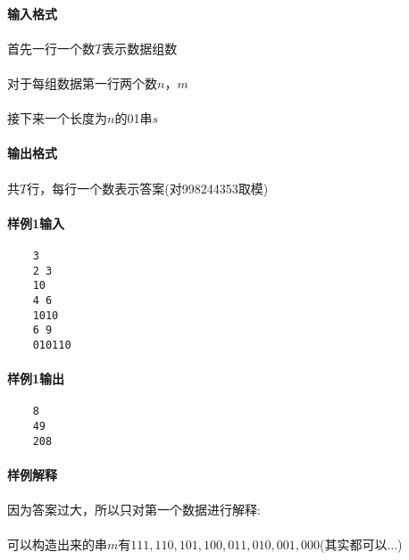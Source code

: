 \documentclass[UTF8]{ctexart}
\begin{document}
\paragraph{输入格式}
\paragraph{}首先一行一个数$T$表示数据组数
\paragraph{}对于每组数据第一行两个数$n$，$m$
\paragraph{}接下来一个长度为$n$的01串$s$
\paragraph{输出格式}
\paragraph{}共$T$行，每行一个数表示答案(对998244353取模)
\paragraph{样例1输入}
\begin{lstlisting}
    3
    2 3
    10
    4 6
    1010
    6 9
    010110
\end{lstlisting}
\paragraph{样例1输出}
\begin{lstlisting}
    8
    49
    208
\end{lstlisting}
\paragraph{}
\paragraph{样例解释}
\paragraph{}因为答案过大，所以只对第一个数据进行解释:
\paragraph{}可以构造出来的串$m$有$111,110,101,100,011,010,001,000$(其实都可以$\dots$)
\end{document}
